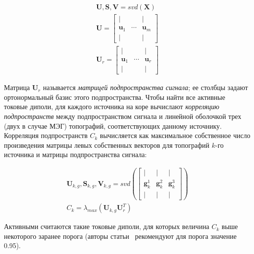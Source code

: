 \begin{gather}
    \mathbf{U}, \mathbf{S}, \mathbf{V} = svd(\mathbf{X}) \\
    \mathbf{U} =
        \begin{bmatrix}
            |                 &               & |            \\
            \mathbf{u}_1      & \cdots        & \mathbf{u}_m \\
            |                 &               & |
        \end{bmatrix}\\
    \mathbf{U}_r = 
        \begin{bmatrix}
            |                 &               & |            \\
            \mathbf{u}_1      & \cdots        & \mathbf{u}_r \\
            |                 &               & |
        \end{bmatrix}
\end{gather}

Матрица $\mathbf{U}_r$ называется \emph{матрицей подпространства сигнала};
ее столбцы задают ортонормальный базис этого подпространства.
Чтобы найти все активные токовые диполи, для каждого источника на коре
вычислают \emph{корреляцию подпространств} между подпространством сигнала и
линейной оболочкой трех (двух в случае МЭГ) топографий, соответствующих данному источнику.
Корреляция подпространств $C_k$ вычисляется как максимальное собственное число
произведения матрицы левых собственных векторов для топографий $k$-го источника
и матрицы подпространства сигнала:

\begin{gather}
    \mathbf{U}_{k,g}, \mathbf{S}_{k,g}, \mathbf{V}_{k,g} = svd\left(
            \begin{bmatrix}
                |                 & |              & |              \\
                \mathbf{g}_k^1    & \mathbf{g}_k^2 & \mathbf{g}_k^3 \\
                |                 & |              & |
            \end{bmatrix}
     \right)\\
     C_k = \lambda_{max}(\mathbf{U}_{k,g} \mathbf{U}_r^T)
\end{gather}

Активными считаются такие токовые диполи, для которых величина $C_k$ выше некоторого
заранее порога (авторы статьи~\cite{Mosher1992} рекомендуют для порога значение 0.95).


